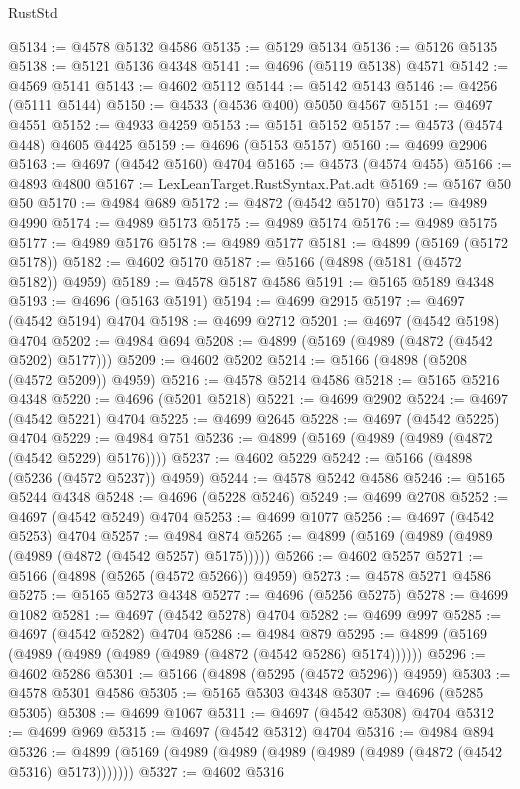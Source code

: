 \begin{lexlean}{RustStd}
\begin{coremodule}
@5134 := @4578 @5132 @4586
@5135 := @5129 @5134
@5136 := @5126 @5135
@5138 := @5121 @5136 @4348
@5141 := @4696 (@5119 @5138) @4571
@5142 := @4569 @5141
@5143 := @4602 @5112
@5144 := @5142 @5143
@5146 := @4256 (@5111 @5144)
@5150 := @4533 (@4536 @400) @5050 @4567
@5151 := @4697 @4551
@5152 := @4933 @4259
@5153 := @5151 @5152
@5157 := @4573 (@4574 @448) @4605 @4425
@5159 := @4696 (@5153 @5157)
@5160 := @4699 @2906
@5163 := @4697 (@4542 @5160) @4704
@5165 := @4573 (@4574 @455)
@5166 := @4893 @4800
@5167 := LexLeanTarget.RustSyntax.Pat.adt
@5169 := @5167 @50 @50
@5170 := @4984 @689
@5172 := @4872 (@4542 @5170)
@5173 := @4989 @4990
@5174 := @4989 @5173
@5175 := @4989 @5174
@5176 := @4989 @5175
@5177 := @4989 @5176
@5178 := @4989 @5177
@5181 := @4899 (@5169 (@5172 @5178))
@5182 := @4602 @5170
@5187 := @5166 (@4898 (@5181 (@4572 @5182)) @4959)
@5189 := @4578 @5187 @4586
@5191 := @5165 @5189 @4348
@5193 := @4696 (@5163 @5191)
@5194 := @4699 @2915
@5197 := @4697 (@4542 @5194) @4704
@5198 := @4699 @2712
@5201 := @4697 (@4542 @5198) @4704
@5202 := @4984 @694
@5208 := @4899 (@5169 (@4989 (@4872 (@4542 @5202) @5177)))
@5209 := @4602 @5202
@5214 := @5166 (@4898 (@5208 (@4572 @5209)) @4959)
@5216 := @4578 @5214 @4586
@5218 := @5165 @5216 @4348
@5220 := @4696 (@5201 @5218)
@5221 := @4699 @2902
@5224 := @4697 (@4542 @5221) @4704
@5225 := @4699 @2645
@5228 := @4697 (@4542 @5225) @4704
@5229 := @4984 @751
@5236 := @4899 (@5169 (@4989 (@4989 (@4872 (@4542 @5229) @5176))))
@5237 := @4602 @5229
@5242 := @5166 (@4898 (@5236 (@4572 @5237)) @4959)
@5244 := @4578 @5242 @4586
@5246 := @5165 @5244 @4348
@5248 := @4696 (@5228 @5246)
@5249 := @4699 @2708
@5252 := @4697 (@4542 @5249) @4704
@5253 := @4699 @1077
@5256 := @4697 (@4542 @5253) @4704
@5257 := @4984 @874
@5265 := @4899 (@5169 (@4989 (@4989 (@4989 (@4872 (@4542 @5257) @5175)))))
@5266 := @4602 @5257
@5271 := @5166 (@4898 (@5265 (@4572 @5266)) @4959)
@5273 := @4578 @5271 @4586
@5275 := @5165 @5273 @4348
@5277 := @4696 (@5256 @5275)
@5278 := @4699 @1082
@5281 := @4697 (@4542 @5278) @4704
@5282 := @4699 @997
@5285 := @4697 (@4542 @5282) @4704
@5286 := @4984 @879
@5295 := @4899 (@5169 (@4989 (@4989 (@4989 (@4989 (@4872 (@4542 @5286) @5174))))))
@5296 := @4602 @5286
@5301 := @5166 (@4898 (@5295 (@4572 @5296)) @4959)
@5303 := @4578 @5301 @4586
@5305 := @5165 @5303 @4348
@5307 := @4696 (@5285 @5305)
@5308 := @4699 @1067
@5311 := @4697 (@4542 @5308) @4704
@5312 := @4699 @969
@5315 := @4697 (@4542 @5312) @4704
@5316 := @4984 @894
@5326 := @4899 (@5169 (@4989 (@4989 (@4989 (@4989 (@4989 (@4872 (@4542 @5316) @5173)))))))
@5327 := @4602 @5316

\end{coremodule}
\end{lexlean}
